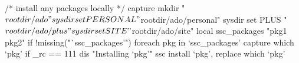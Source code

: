 /* install any packages locally */
capture mkdir "$rootdir/ado"
sysdir set PERSONAL "$rootdir/ado/personal"
sysdir set PLUS     "$rootdir/ado/plus"
sysdir set SITE     "$rootdir/ado/site"
local ssc\_packages "pkg1 pkg2"
{\smallskip}
if !missing("`ssc\_packages'") {\lbr}
        foreach pkg in `ssc\_packages' {\lbr}
                capture which `pkg'
                if _rc == 111 {\lbr}                 
                        dis "Installing `pkg'"
                        ssc install `pkg', replace
                {\rbr}
                which `pkg'
        {\rbr}
{\rbr}
